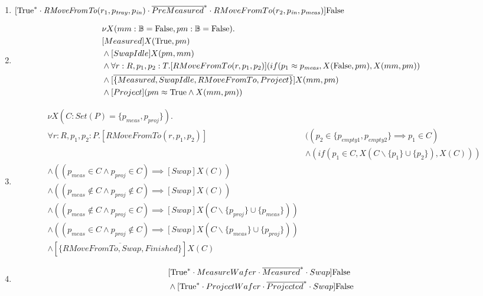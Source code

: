 \begin{enumerate}
    \item $[\text{True}^{*}\cdot \mathit{RMoveFromTo}(r_1, p_\mathit{tray}, p_\mathit{in}) \cdot \overline{PreMeasured}^{*} \cdot RMoveFromTo(r_2, p_\mathit{in}, p_\mathit{meas})]\text{False}$
    \item \begin{align*}
    	&\nu X(mm:\mathbb{B} = \text{False}, pm:\mathbb{B}=\text{False}).\\
    	&[Measured]X(\text{True}, pm)\\
    	&\wedge [SwapIdle]X(pm, mm)\\
    	&\wedge \forall r:R, p_1, p_2:T.[RMoveFromTo(r, p_1, p_2)](if(p_1 \approx p_\mathit{meas}, X(\text{False}, pm), X(mm, pm))\\
    	&\wedge [\overline{\{Measured, SwapIdle, RMoveFromTo, Project\}}]X(mm, pm)\\
    	&\wedge [Project](pm \approx \text{True} \wedge X(mm, pm))
    \end{align*}
        \item \begin{align*}
            &\nu X(C : Set(P) = \{p_\mathit{meas},p_\mathit{proj}\}).\\
            & \forall r:R, p_1, p_2 : P . [RMoveFromTo(r, p_1, p_2)]&((p_2 \in \{p_\mathit{empty1}, p_\mathit{empty2}\} \implies p_1 \in C)\\
            &&\wedge (if(p_1 \in C, X(C\backslash\{p_1\}\cup\{p_2\}), X(C))) \\
            &\wedge ((p_\mathit{meas} \in C \wedge p_\mathit{proj} \in C) \implies [Swap]X(C))\\
            &\wedge ((p_\mathit{meas} \notin C \wedge p_\mathit{proj} \notin C) \implies [Swap]X(C))\\
            &\wedge ((p_\mathit{meas} \notin C \wedge p_\mathit{proj} \in C) \implies [Swap]X(C\backslash\{p_\mathit{proj}\} \cup \{p_\mathit{meas}\}))\\
            &\wedge ((p_\mathit{meas} \in C \wedge p_\mathit{proj} \notin C) \implies [Swap]X(C\backslash\{p_\mathit{meas}\} \cup \{p_\mathit{proj}\}))\\
            &\wedge [\overline{\{RMoveFromTo, Swap, Finished\}}]X(C)
        \end{align*}
    \item \begin{align*}
	    &[\true^{*}\cdot MeasureWafer\cdot \overline{Measured}^{*}\cdot Swap]\false\\
		&\wedge [\true^{*}\cdot ProjectWafer\cdot \overline{Projected}^{*}\cdot Swap]\false\\

\end{align*}
\end{enumerate}
